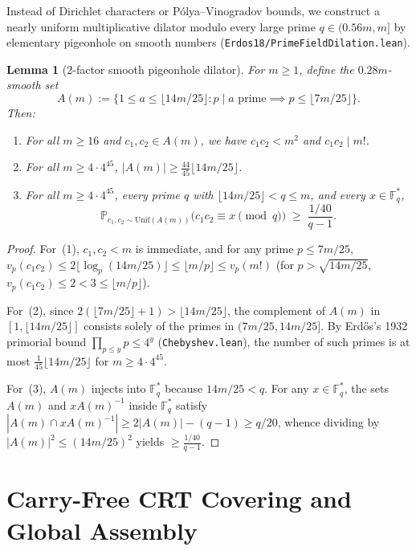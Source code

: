 \documentclass[11pt,a4paper]{amsart}
\newtheorem{lemma}[theorem]{Lemma}
\theoremstyle{definition}
\theoremstyle{remark}
\newcommand{\F}{\mathbb{F}}
\newcommand{\Unif}{\mathrm{Unif}}
\begin{document}
Instead of Dirichlet characters or P\'olya--Vinogradov bounds, we construct a nearly uniform multiplicative dilator modulo every large prime $q \in (0.56 m, m]$ by elementary pigeonhole on smooth numbers (\texttt{Erdos18/PrimeFieldDilation.lean}).

\begin{lemma}[2-factor smooth pigeonhole dilator]\label{lem:pigeonhole}
For $m \ge 1$, define the $0.28 m$-smooth set
\[
  A(m) := \bigl\{1 \le a \le \lfloor 14m/25 \rfloor : p \mid a \text{ prime} \implies p \le \lfloor 7m/25 \rfloor\bigr\}.
\]
Then:
\begin{enumerate}
  \item For all $m \ge 16$ and $c_1, c_2 \in A(m)$, we have $c_1 c_2 < m^2$ and $c_1 c_2 \mid m!$.
  \item For all $m \ge 4 \cdot 4^{45}$, $|A(m)| \ge \frac{44}{45}\lfloor 14m/25 \rfloor$.
  \item For all $m \ge 4 \cdot 4^{45}$, every prime $q$ with $\lfloor 14m/25 \rfloor < q \le m$, and every $x \in \F_q^*$,
  \[
    \mathbb{P}_{c_1, c_2 \sim \Unif(A(m))}\bigl(c_1 c_2 \equiv x \pmod q\bigr) \;\ge\; \frac{1/40}{q - 1}.
  \]
\end{enumerate}
\end{lemma}

\begin{proof}
For~(1), $c_1, c_2 < m$ is immediate, and for any prime $p \le 7m/25$, $v_p(c_1 c_2) \le 2\lfloor \log_p(14m/25) \rfloor \le \lfloor m/p \rfloor \le v_p(m!)$ (for $p > \sqrt{14m/25}$, $v_p(c_1 c_2) \le 2 < 3 \le \lfloor m/p \rfloor$).

For~(2), since $2(\lfloor 7m/25 \rfloor + 1) > \lfloor 14m/25 \rfloor$, the complement of $A(m)$ in $[1, \lfloor 14m/25 \rfloor]$ consists solely of the primes in $(7m/25, 14m/25]$. By Erd\H{o}s's 1932 primorial bound $\prod_{p \le y} p \le 4^y$ (\texttt{Chebyshev.lean}), the number of such primes is at most $\frac{1}{45}\lfloor 14m/25 \rfloor$ for $m \ge 4\cdot 4^{45}$.

For~(3), $A(m)$ injects into $\F_q^*$ because $14m/25 < q$. For any $x \in \F_q^*$, the sets $A(m)$ and $x A(m)^{-1}$ inside $\F_q^*$ satisfy $|A(m) \cap x A(m)^{-1}| \ge 2|A(m)| - (q-1) \ge q/20$, whence dividing by $|A(m)|^2 \le (14m/25)^2$ yields $\ge \frac{1/40}{q-1}$.
\end{proof}

\section{Carry-Free CRT Covering and Global Assembly}\label{sec:covering}
\end{document}
